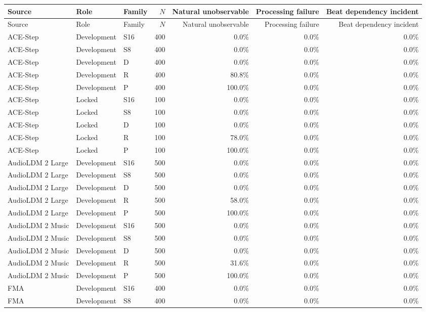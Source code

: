 \begin{longtable}{lllrrrr}
\toprule
Source & Role & Family & $N$ & Natural unobservable & Processing failure & Beat dependency incident \\
\midrule
\endfirsthead
\toprule
Source & Role & Family & $N$ & Natural unobservable & Processing failure & Beat dependency incident \\
\midrule
\endhead
ACE-Step & Development & S16 & 400 & 0.0\% & 0.0\% & 0.0\% \\
ACE-Step & Development & S8 & 400 & 0.0\% & 0.0\% & 0.0\% \\
ACE-Step & Development & D & 400 & 0.0\% & 0.0\% & 0.0\% \\
ACE-Step & Development & R & 400 & 80.8\% & 0.0\% & 0.0\% \\
ACE-Step & Development & P & 400 & 100.0\% & 0.0\% & 0.0\% \\
ACE-Step & Locked & S16 & 100 & 0.0\% & 0.0\% & 0.0\% \\
ACE-Step & Locked & S8 & 100 & 0.0\% & 0.0\% & 0.0\% \\
ACE-Step & Locked & D & 100 & 0.0\% & 0.0\% & 0.0\% \\
ACE-Step & Locked & R & 100 & 78.0\% & 0.0\% & 0.0\% \\
ACE-Step & Locked & P & 100 & 100.0\% & 0.0\% & 0.0\% \\
AudioLDM 2 Large & Development & S16 & 500 & 0.0\% & 0.0\% & 0.0\% \\
AudioLDM 2 Large & Development & S8 & 500 & 0.0\% & 0.0\% & 0.0\% \\
AudioLDM 2 Large & Development & D & 500 & 0.0\% & 0.0\% & 0.0\% \\
AudioLDM 2 Large & Development & R & 500 & 58.0\% & 0.0\% & 0.0\% \\
AudioLDM 2 Large & Development & P & 500 & 100.0\% & 0.0\% & 0.0\% \\
AudioLDM 2 Music & Development & S16 & 500 & 0.0\% & 0.0\% & 0.0\% \\
AudioLDM 2 Music & Development & S8 & 500 & 0.0\% & 0.0\% & 0.0\% \\
AudioLDM 2 Music & Development & D & 500 & 0.0\% & 0.0\% & 0.0\% \\
AudioLDM 2 Music & Development & R & 500 & 31.6\% & 0.0\% & 0.0\% \\
AudioLDM 2 Music & Development & P & 500 & 100.0\% & 0.0\% & 0.0\% \\
FMA & Development & S16 & 400 & 0.0\% & 0.0\% & 0.0\% \\
FMA & Development & S8 & 400 & 0.0\% & 0.0\% & 0.0\% \\

\end{longtable}
